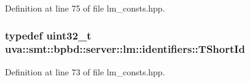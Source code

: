 Definition at line 75 of file lm\+\_\+consts.\+hpp.

\hypertarget{namespaceuva_1_1smt_1_1bpbd_1_1server_1_1lm_1_1identifiers_a33043a191e9a637dea742a89d23c8bdc}{}
\subsubsection[{T\+Short\+Id}]{\setlength{\rightskip}{0pt plus 5cm}typedef uint32\+\_\+t {\bf uva\+::smt\+::bpbd\+::server\+::lm\+::identifiers\+::\+T\+Short\+Id}}\label{namespaceuva_1_1smt_1_1bpbd_1_1server_1_1lm_1_1identifiers_a33043a191e9a637dea742a89d23c8bdc}


Definition at line 73 of file lm\+\_\+consts.\+hpp.

